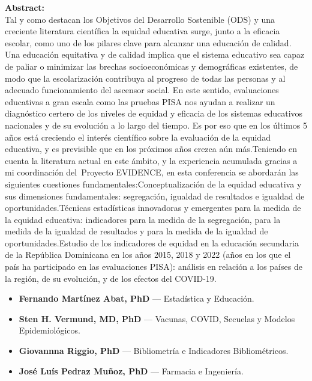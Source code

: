 \documentclass[11pt,a4paper]{article}
\begin{document}
\noindent \textbf{Abstract:} \\

\cite{cordero2020gamification} Tal y como destacan los Objetivos del Desarrollo Sostenible (ODS) y una creciente literatura científica la equidad educativa surge, junto a la eficacia escolar, como uno de los pilares clave para alcanzar una educación de calidad. Una educación equitativa y de calidad implica que el sistema educativo sea capaz de paliar o minimizar las brechas socioeconómicas y demográficas existentes, de modo que la escolarización contribuya al progreso de todas las personas y al adecuado funcionamiento del ascensor social. En este sentido, evaluaciones educativas a gran escala como las pruebas PISA nos ayudan a realizar un diagnóstico certero de los niveles de equidad y eficacia de los sistemas educativos nacionales y de su evolución a lo largo del tiempo. Es por eso que en los últimos 5 años está creciendo el interés científico sobre la evaluación de la equidad educativa, y es previsible que en los próximos años crezca aún más.Teniendo en cuenta la literatura actual en este ámbito, y la experiencia acumulada gracias a mi coordinación del Proyecto EVIDENCE, en esta conferencia se abordarán las siguientes cuestiones fundamentales:Conceptualización de la equidad educativa y sus dimensiones fundamentales: segregación, igualdad de resultados e igualdad de oportunidades.Técnicas estadísticas innovadoras y emergentes para la medida de la equidad educativa: indicadores para la medida de la segregación, para la medida de la igualdad de resultados y para la medida de la igualdad de oportunidades.Estudio de los indicadores de equidad en la educación secundaria de la República Dominicana en los años 2015, 2018 y 2022 (años en los que el país ha participado en las evaluaciones PISA): análisis en relación a los países de la región, de su evolución, y de los efectos del COVID-19.



\begin{itemize}[leftmargin=*, label={--}]
    \item \textbf{Fernando Martínez Abat, PhD} --- Estadística y Educación.
    \item \textbf{Sten H. Vermund, MD, PhD} --- Vacunas, COVID, Secuelas y Modelos Epidemiológicos.
    \item \textbf{Giovannna Riggio, PhD} --- Bibliometría e Indicadores Bibliométricos.
    \item \textbf{José Luís Pedraz Muñoz, PhD} --- Farmacia e Ingeniería.
\end{itemize}
\end{document}
